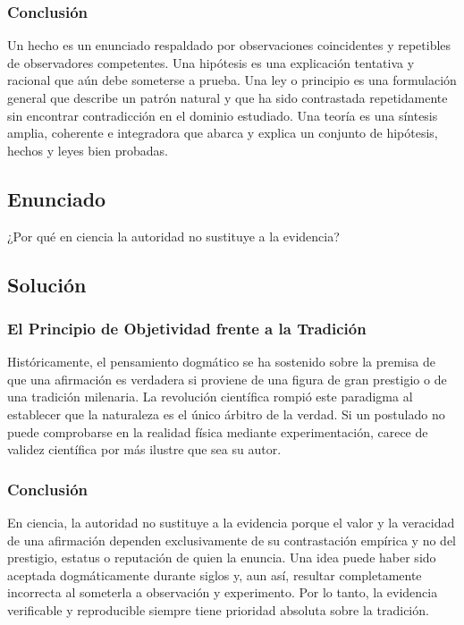 \documentclass[12pt, a4paper]{article}
\begin{document}
\subsubsection*{Conclusión}
Un hecho es un enunciado respaldado por observaciones coincidentes y repetibles de observadores competentes. Una hipótesis es una explicación tentativa y racional que aún debe someterse a prueba. Una ley o principio es una formulación general que describe un patrón natural y que ha sido contrastada repetidamente sin encontrar contradicción en el dominio estudiado. Una teoría es una síntesis amplia, coherente e integradora que abarca y explica un conjunto de hipótesis, hechos y leyes bien probadas.

\newpage

\subsection*{Enunciado}
¿Por qué en ciencia la autoridad no sustituye a la evidencia?

\subsection*{Solución}

\subsubsection*{El Principio de Objetividad frente a la Tradición}
Históricamente, el pensamiento dogmático se ha sostenido sobre la premisa de que una afirmación es verdadera si proviene de una figura de gran prestigio o de una tradición milenaria. La revolución científica rompió este paradigma al establecer que la naturaleza es el único árbitro de la verdad. Si un postulado no puede comprobarse en la realidad física mediante experimentación, carece de validez científica por más ilustre que sea su autor.

\subsubsection*{Conclusión}
En ciencia, la autoridad no sustituye a la evidencia porque el valor y la veracidad de una afirmación dependen exclusivamente de su contrastación empírica y no del prestigio, estatus o reputación de quien la enuncia. Una idea puede haber sido aceptada dogmáticamente durante siglos y, aun así, resultar completamente incorrecta al someterla a observación y experimento. Por lo tanto, la evidencia verificable y reproducible siempre tiene prioridad absoluta sobre la tradición.
\end{document}
